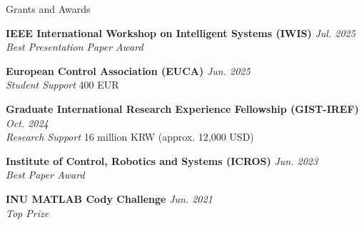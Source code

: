 \documentclass{resume} %
\begin{document}
\begin{rSection}{Grants and Awards}

\small{

    {\bf IEEE International Workshop on Intelligent Systems (IWIS)} 
        \hfill 
        {\em Jul. 2025} 
        \\
        {\textit {Best Presentation Paper Award}} 

    {\bf European Control Association (EUCA) } 
        \hfill 
        {\em Jun. 2025} 
        \\
        {\textit {Student Support}}
        \hfill 
        {400 EUR}

    {\bf Graduate International Research Experience Fellowship (GIST-IREF)} 
        \hfill 
        {\em Oct. 2024} 
        \\
        {\textit {Research Support}}
        \hfill 
        {16 million KRW (approx. 12,000 USD)}
        
    {\bf Institute of Control, Robotics and Systems (ICROS)} 
        \hfill 
        {\em Jun. 2023} 
        \\
        {\textit {Best Paper Award}} 

    {\bf INU MATLAB Cody Challenge} 
        \hfill 
        {\em Jun. 2021} 
        \\
        {\textit {Top Prize}} 

}

\end{rSection}
\end{document}
